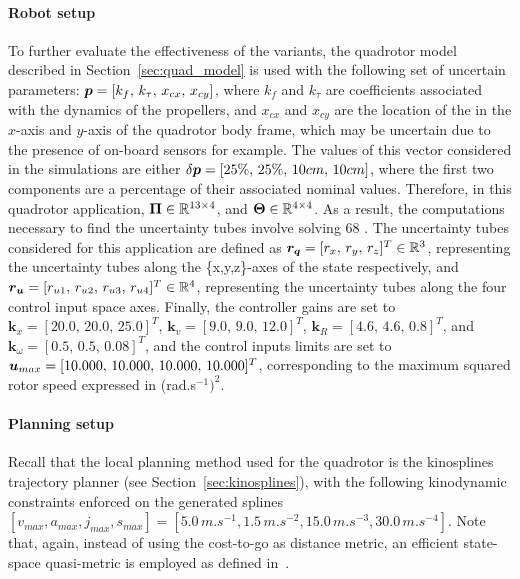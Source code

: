 \paragraph{Robot setup}

To further evaluate the effectiveness of the  variants, the quadrotor model described in Section~\ref{sec:quad_model} is used with the following set of uncertain parameters: $\boldsymbol{p} = [k_{f}, \, k_{\tau}, \, x_{cx}, \, x_{cy}]$, where $k_{f}$ and $k_{\tau}$ are coefficients associated with the dynamics of the propellers, and $x_{cx}$ and $x_{cy}$ are the location of the  in the $x$-axis and $y$-axis of the quadrotor body frame, which may be uncertain due to the presence of on-board sensors for example.
The values of this vector considered in the simulations are either $\delta\boldsymbol{p} = [25\%, \, 25\%, \, 10cm, \, 10cm]$, where the first two components are a percentage of their associated nominal values. 
Therefore, in this quadrotor application, $\boldsymbol{\Pi} \in \mathbb{R}^{13\times4}$, and $\boldsymbol{\Theta} \in \mathbb{R}^{4\times4}$.
As a result, the computations necessary to find the uncertainty tubes involve solving 68 .
The uncertainty tubes considered for this application are defined as $\boldsymbol{r_q} = [r_x, \, r_y, \, r_z]^T \in \mathbb{R}^3$, representing the uncertainty tubes along the \{x,y,z\}-axes of the state respectively, and $\boldsymbol{r_u} = [r_{u1}, \, r_{u2}, \, r_{u3}, \, r_{u4}]^T \in \mathbb{R}^4$, representing the uncertainty tubes along the four control input space axes.
Finally, the controller gains are set to $\boldsymbol{k}_{x} = [20.0, \, 20.0, \, 25.0]^T$, $\boldsymbol{k}_{v}= [9.0, \, 9.0, \, 12.0]^T$, $\boldsymbol{k}_{R}=[4.6, \, 4.6, \, 0.8]^T$, and $\boldsymbol{k}_{\omega}=[0.5, \, 0.5, \, 0.08]^T$, and the control inputs limits are set to $\boldsymbol{u}_{max} = [10.000, \, 10.000, \, 10.000, \, 10.000]^T$, corresponding to the maximum squared rotor speed expressed in (rad.s$^{-1})^2$.

\paragraph{Planning setup}

Recall that the local planning method used for the quadrotor is the kinosplines trajectory planner (see Section~\ref{sec:kinosplines}), with the following kinodynamic constraints enforced on the generated splines $[v_{max}, a_{max}, j_{max}, s_{max}] = [5.0 \, m.s^{-1}, \allowbreak 1.5 \, m.s^{-2}, \allowbreak 15.0 \, m.s^{-3}, \allowbreak 30.0 \, m.s^{-4}]$. 
Note that, again, instead of using the cost-to-go as distance metric, an efficient state-space quasi-metric is employed as defined in~\cite{cKino}.

